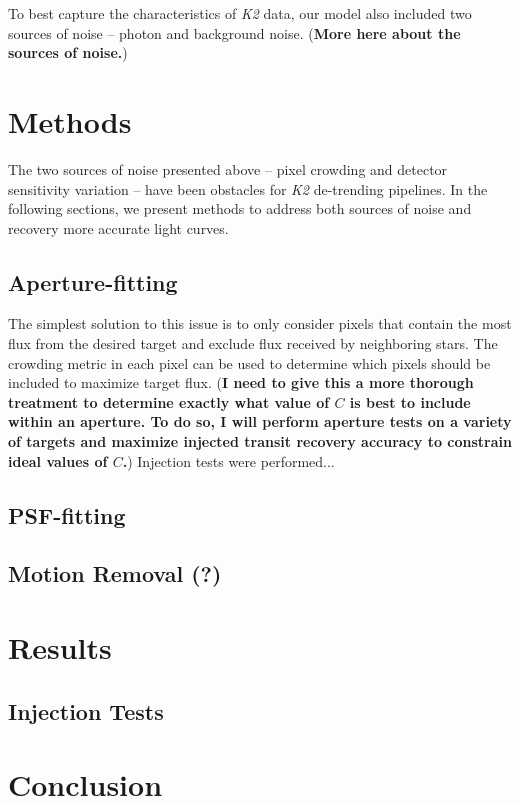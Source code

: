 \documentclass[12pt,preprint]{aastex}
\begin{document}
To best capture the characteristics of \textit{K2} data, our model also included two sources of noise -- photon and background noise. (\textbf{More here about the sources of noise.})

\section{Methods}

The two sources of noise presented above -- pixel crowding and detector sensitivity variation -- have been obstacles for \textit{K2} de-trending pipelines. In the following sections, we present methods to address both sources of noise and recovery more accurate light curves.

\subsection{Aperture-fitting}

The simplest solution to this issue is to only consider pixels that contain the most flux from the desired target and exclude flux received by neighboring stars. The crowding metric in each pixel can be used to determine which pixels should be included to maximize target flux. (\textbf{I need to give this a more thorough treatment to determine exactly what value of $C$ is best to include within an aperture. To do so, I will perform aperture tests on a variety of targets and maximize injected transit recovery accuracy to constrain ideal values of $C$.}) Injection tests were performed...



\subsection{PSF-fitting}

\subsection{Motion Removal (?)}

\section{Results}

\subsection{Injection Tests}

\section{Conclusion}

\clearpage


\end{document}
